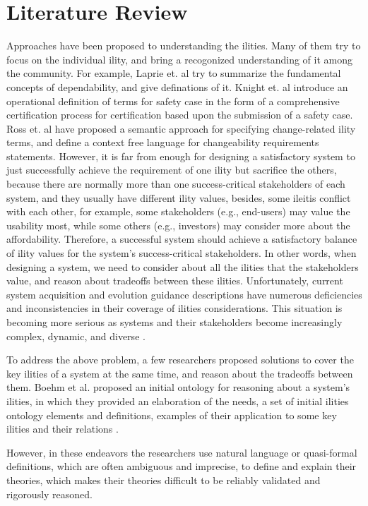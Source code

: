 \documentclass{article} %
\begin{document}
\section{Literature Review}

Approaches have been proposed to understanding the ilities. Many of them try to focus on the individual ility, and bring a recogonized understanding of it among the community. For example, Laprie et. al  \cite{Laprie:dependability} try to summarize the fundamental concepts of dependability, and give definations of it.  Knight et. al \cite{Knight:safety} introduce an operational definition of  terms for safety case in the form of a comprehensive certification process for certification based upon the submission of a safety case. Ross et. al \cite{Ross:changeability} have proposed a semantic approach for specifying change-related ility terms, and define a context free language for changeability requirements statements. However, it is far from enough for designing a satisfactory system to just successfully achieve the requirement of one ility but sacrifice the others, because there are normally more than one success-critical stakeholders of each system, and they usually have different ility values, besides, some ileitis conflict with each other, for example, some stakeholders (e.g., end-users) may value the usability most, while some others (e.g., investors) may consider more about the affordability. Therefore, a successful system should achieve a satisfactory balance of ility values for the system's success-critical stakeholders. In other words, when designing a system, we need to consider about all the ilities that the stakeholders value, and reason about tradeoffs between these ilities. Unfortunately, current system acquisition and evolution guidance descriptions have numerous deficiencies and inconsistencies in their coverage of ilities considerations. This situation is becoming more serious as systems and their stakeholders become increasingly complex, dynamic, and diverse \cite{Boehm:ontology}.

To address the above problem, a few researchers proposed solutions to cover the key ilities of a system at the same time, and reason about the tradeoffs between them. Boehm et al. proposed an initial ontology for reasoning about a system's ilities, in which they provided an elaboration of the needs, a set of initial ilities ontology elements and definitions, examples of their application to some key ilities and their relations \cite{Boehm:ontology}. 

However, in these endeavors the researchers use natural language or quasi-formal definitions, which are often ambiguous and imprecise, to define and explain their theories, which makes their theories difficult to be reliably validated and rigorously reasoned. 
\end{document}
